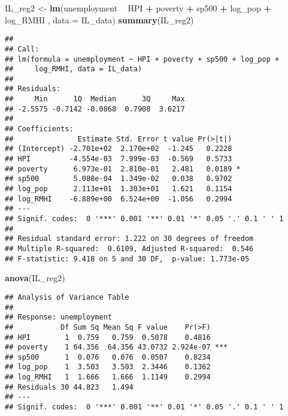 \documentclass[
]{article}
\newenvironment{Shaded}{\begin{snugshade}}{\end{snugshade}}
\newcommand{\DataTypeTok}[1]{\textcolor[rgb]{0.13,0.29,0.53}{#1}}
\newcommand{\KeywordTok}[1]{\textcolor[rgb]{0.13,0.29,0.53}{\textbf{#1}}}
\newcommand{\NormalTok}[1]{#1}
\newcommand{\OperatorTok}[1]{\textcolor[rgb]{0.81,0.36,0.00}{\textbf{#1}}}
\newcommand{\StringTok}[1]{\textcolor[rgb]{0.31,0.60,0.02}{#1}}
\begin{document}
\begin{Shaded}
\begin{Highlighting}[]
\NormalTok{IL_reg2 <-}\StringTok{ }\KeywordTok{lm}\NormalTok{(unemployment }\OperatorTok{~}\StringTok{ }\NormalTok{HPI }\OperatorTok{+}\StringTok{ }\NormalTok{poverty }\OperatorTok{+}\StringTok{ }\NormalTok{sp500 }\OperatorTok{+}\StringTok{ }\NormalTok{log_pop }\OperatorTok{+}\StringTok{ }\NormalTok{log_RMHI , }\DataTypeTok{data =}\NormalTok{ IL_data)}
\KeywordTok{summary}\NormalTok{(IL_reg2)}
\end{Highlighting}
\end{Shaded}

\begin{verbatim}
## 
## Call:
## lm(formula = unemployment ~ HPI + poverty + sp500 + log_pop + 
##     log_RMHI, data = IL_data)
## 
## Residuals:
##     Min      1Q  Median      3Q     Max 
## -2.5575 -0.7142 -0.0868  0.7908  3.6217 
## 
## Coefficients:
##               Estimate Std. Error t value Pr(>|t|)  
## (Intercept) -2.701e+02  2.170e+02  -1.245   0.2228  
## HPI         -4.554e-03  7.999e-03  -0.569   0.5733  
## poverty      6.973e-01  2.810e-01   2.481   0.0189 *
## sp500        5.088e-04  1.349e-02   0.038   0.9702  
## log_pop      2.113e+01  1.303e+01   1.621   0.1154  
## log_RMHI    -6.889e+00  6.524e+00  -1.056   0.2994  
## ---
## Signif. codes:  0 '***' 0.001 '**' 0.01 '*' 0.05 '.' 0.1 ' ' 1
## 
## Residual standard error: 1.222 on 30 degrees of freedom
## Multiple R-squared:  0.6109, Adjusted R-squared:  0.546 
## F-statistic: 9.418 on 5 and 30 DF,  p-value: 1.773e-05
\end{verbatim}

\begin{Shaded}
\begin{Highlighting}[]
\KeywordTok{anova}\NormalTok{(IL_reg2)}
\end{Highlighting}
\end{Shaded}

\begin{verbatim}
## Analysis of Variance Table
## 
## Response: unemployment
##           Df Sum Sq Mean Sq F value    Pr(>F)    
## HPI        1  0.759   0.759  0.5078    0.4816    
## poverty    1 64.356  64.356 43.0732 2.924e-07 ***
## sp500      1  0.076   0.076  0.0507    0.8234    
## log_pop    1  3.503   3.503  2.3446    0.1362    
## log_RMHI   1  1.666   1.666  1.1149    0.2994    
## Residuals 30 44.823   1.494                      
## ---
## Signif. codes:  0 '***' 0.001 '**' 0.01 '*' 0.05 '.' 0.1 ' ' 1
\end{verbatim}
\end{document}
